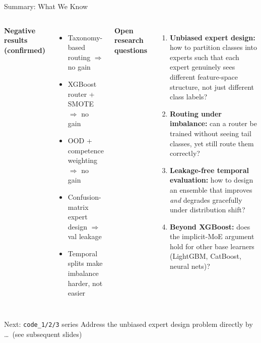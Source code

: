 \documentclass[aspectratio=169,10pt]{beamer}
\begin{document}
\begin{frame}{Summary: What We Know}
  \begin{columns}[T]
      \textbf{Negative results (confirmed)}
      \begin{itemize}
        \item Taxonomy-based routing $\Rightarrow$ no gain
        \item XGBoost router + SMOTE $\Rightarrow$ no gain
        \item OOD + competence weighting $\Rightarrow$ no gain
        \item Confusion-matrix expert design $\Rightarrow$ val leakage
        \item Temporal splits make imbalance harder, not easier
      \end{itemize}
      \textbf{Open research questions}
      \begin{enumerate}
        \item \textbf{Unbiased expert design:} how to partition classes into
              experts such that each expert genuinely sees different
              feature-space structure, not just different class labels?
        \item \textbf{Routing under imbalance:} can a router be trained
              without seeing tail classes, yet still route them correctly?
        \item \textbf{Leakage-free temporal evaluation:} how to design an
              ensemble that improves \emph{and} degrades gracefully under
              distribution shift?
        \item \textbf{Beyond XGBoost:} does the implicit-MoE argument hold
              for other base learners (LightGBM, CatBoost, neural nets)?
      \end{enumerate}
  \end{columns}
  \vspace{10pt}
  \begin{block}{Next: \texttt{code\_1/2/3} series}
    Address the unbiased expert design problem directly
    by \ldots\ (see subsequent slides)
  \end{block}
\end{frame}
\end{document}
